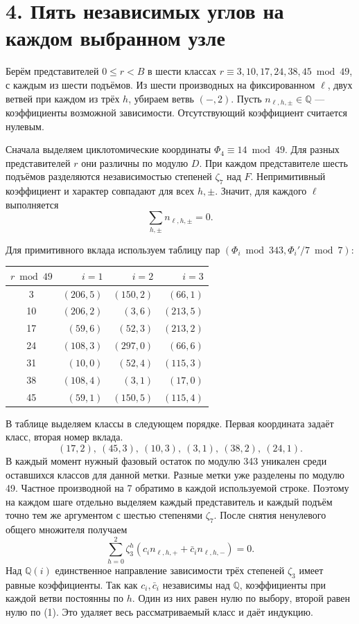 \documentclass[11pt,a4paper]{article}
\newcommand{\sect}[1]{\section*{\sffamily\color{ink}#1}}
\newcommand{\QQ}{\mathbb Q}
\begin{document}
\newpage
\sect{4. Пять независимых углов на каждом выбранном узле}
Берём представителей \(0\le r<B\) в шести классах \(r\equiv3,10,17,24,38,45\bmod49\), с каждым из шести подъёмов. Из шести производных на фиксированном \(\ell\), двух ветвей при каждом из трёх \(h\), убираем ветвь \((- ,2)\). Пусть \(n_{\ell,h,\pm}\in\QQ\) --- коэффициенты возможной зависимости. Отсутствующий коэффициент считается нулевым.

Сначала выделяем циклотомические координаты \(\Phi_4\equiv14\bmod49\). Для разных представителей \(r\) они различны по модулю \(D\). При каждом представителе шесть подъёмов разделяются независимостью степеней \(\zeta_7\) над \(F\). Непримитивный коэффициент и характер совпадают для всех \(h,\pm\). Значит, для каждого \(\ell\) выполняется
\[
                       \sum_{h,\pm}n_{\ell,h,\pm}=0 .                 \tag{1}
\]

Для примитивного вклада используем таблицу пар \((\Phi_i\bmod343,\Phi_i'/7\bmod7)\):
\begin{center}\small
\begin{tabular}{crrr}
\toprule
\(r\bmod49\)&\(i=1\)&\(i=2\)&\(i=3\)\\
\midrule
3  &\((206,5)\)&\((150,2)\)&\((66,1)\)\\
10 &\((206,2)\)&\((3,6)\)&\((213,5)\)\\
17 &\((59,6)\)&\((52,3)\)&\((213,2)\)\\
24 &\((108,3)\)&\((297,0)\)&\((66,6)\)\\
31 &\((10,0)\)&\((52,4)\)&\((115,3)\)\\
38 &\((108,4)\)&\((3,1)\)&\((17,0)\)\\
45 &\((59,1)\)&\((150,5)\)&\((115,4)\)\\
\bottomrule
\end{tabular}
\end{center}
В таблице выделяем классы в следующем порядке. Первая координата задаёт класс, вторая номер вклада.
\[
   (17,2),\ (45,3),\ (10,3),\ (3,1),\ (38,2),\ (24,1).
\]
 В каждый момент нужный фазовый остаток по модулю 343 уникален среди оставшихся классов для данной метки. Разные метки уже разделены по модулю 49. Частное производной на 7 обратимо в каждой используемой строке. Поэтому на каждом шаге отдельно выделяем каждый представитель и каждый подъём точно тем же аргументом с шестью степенями \(\zeta_7\). После снятия ненулевого общего множителя получаем
\[
 \sum_{h=0}^2\zeta_3^h
       (c_i n_{\ell,h,+}+\bar c_i n_{\ell,h,-})=0 .                    \tag{2}
\]
Над \(\QQ(i)\) единственное направление зависимости трёх степеней \(\zeta_3\) имеет равные коэффициенты. Так как \(c_i,\bar c_i\) независимы над \(\QQ\), коэффициенты при каждой ветви постоянны по \(h\). Один из них равен нулю по выбору, второй равен нулю по (1). Это удаляет весь рассматриваемый класс и даёт индукцию.
\end{document}
